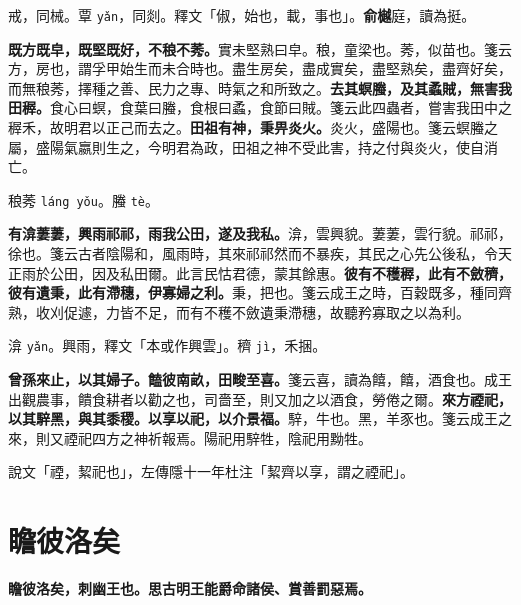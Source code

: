 \begin{quoting}戒，同械。覃 \texttt{yǎn}，同剡。釋文「俶，始也，載，事也」。\textbf{俞樾}庭，讀為挺。\end{quoting}

\textbf{既方既皁，既堅既好，不稂不莠。}{\footnotesize 實未堅熟曰皁。稂，童梁也。莠，似苗也。箋云方，房也，謂孚甲始生而未合時也。盡生房矣，盡成實矣，盡堅熟矣，盡齊好矣，而無稂莠，擇種之善、民力之專、時氣之和所致之。}\textbf{去其螟螣，及其蟊賊，無害我田稺。}{\footnotesize 食心曰螟，食葉曰螣，食根曰蟊，食節曰賊。箋云此四蟲者，嘗害我田中之稺禾，故明君以正己而去之。}\textbf{田祖有神，秉畀炎火。}{\footnotesize 炎火，盛陽也。箋云螟螣之屬，盛陽氣嬴則生之，今明君為政，田祖之神不受此害，持之付與炎火，使自消亡。}

\begin{quoting}稂莠 \texttt{láng yǒu}。螣 \texttt{tè}。\end{quoting}

\textbf{有渰萋萋，興雨祁祁，雨我公田，遂及我私。}{\footnotesize 渰，雲興貌。萋萋，雲行貌。祁祁，徐也。箋云古者陰陽和，風雨時，其來祁祁然而不暴疾，其民之心先公後私，令天正雨於公田，因及私田爾。此言民怙君德，蒙其餘惠。}\textbf{彼有不穫稺，此有不斂穧，彼有遺秉，此有滯穗，伊寡婦之利。}{\footnotesize 秉，把也。箋云成王之時，百穀既多，種同齊熟，收刈促遽，力皆不足，而有不穫不斂遺秉滯穗，故聽矜寡取之以為利。}

\begin{quoting}渰 \texttt{yǎn}。興雨，釋文「本或作興雲」。穧 \texttt{jì}，禾捆。\end{quoting}

\textbf{曾孫來止，以其婦子。饁彼南畝，田畯至喜。}{\footnotesize 箋云喜，讀為饎，饎，酒食也。成王出觀農事，饋食耕者以勸之也，司嗇至，則又加之以酒食，勞倦之爾。}\textbf{來方禋祀，以其騂黑，與其黍稷。以享以祀，以介景福。}{\footnotesize 騂，牛也。黑，羊豕也。箋云成王之來，則又禋祀四方之神祈報焉。陽祀用騂牲，陰祀用黝牲。}

\begin{quoting}說文「禋，絜祀也」，左傳隱十一年杜注「絜齊以享，謂之禋祀」。\end{quoting}

\section{瞻彼洛矣}


\textbf{瞻彼洛矣，刺幽王也。思古明王能爵命諸侯、賞善罰惡焉。}

